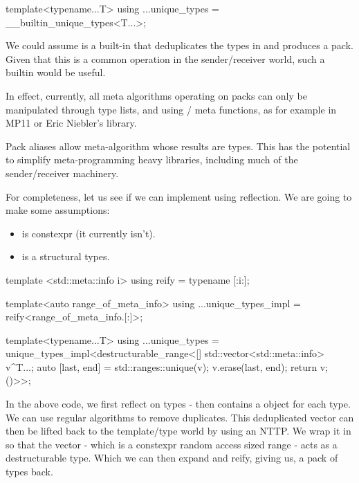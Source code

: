 \documentclass{wg21}
\begin{document}
\begin{colorblock}
    template<typename...T>
    using ...unique_types = __builtin_unique_types<T...>;
\end{colorblock}

We could assume  is a built-in that deduplicates the types in  and produces a pack.
Given that this is a common operation in the sender/receiver world, such a builtin would be useful.

In effect, currently, all meta algorithms operating on packs can only be manipulated through type lists,
and using / meta functions, as for example in MP11 or Eric Niebler's  library.

Pack aliases allow meta-algorithm whose results are types.
This has the potential to simplify meta-programming heavy libraries, including much of the sender/receiver machinery.


For completeness, let us see if we can implement  using reflection.
We are going to make some assumptions:

\begin{itemize}
    \item {} is constexpr (it currently isn't).
    \item {} is a structural types.
\end{itemize}

\begin{colorblock}
template <std::meta::info i>
using reify =  typename [:i:];

template<auto range_of_meta_info>
using ...unique_types_impl = reify<range_of_meta_info.[:]>;

template<typename...T>
using ...unique_types =
    unique_types_impl<destructurable_range<[] {
                std::vector<std::meta::info> v{^T...};
                auto [last, end] = std::ranges::unique(v);
                v.erase(last, end);
                return v;
            }()>{}>;
\end{colorblock}

In the above code, we first reflect on types -  then contains a  object for each type.
We can use regular algorithms to remove duplicates.
This deduplicated vector can then be lifted back to the template/type world by using an NTTP. We wrap it in 
so that the vector - which is a constexpr random access sized range - acts as a destructurable type.
Which we can then expand and reify, giving us, a pack of types back.
\end{document}
